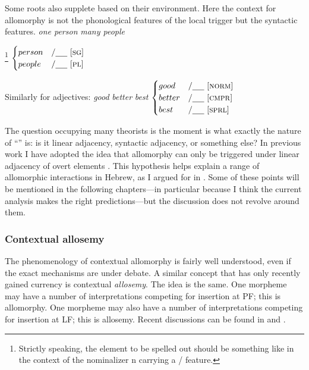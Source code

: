Some roots also supplete based on their environment. Here the context for allomorphy is not the phonological features of the local trigger but the syntactic features.
\pex
	\a \emph{one person}		
	\a \emph{many people}
\xe

\ex  {}\footnote{Strictly speaking, the element to be spelled out should be something like  in the context of the nominalizer n carrying a / feature.} \lra $\begin{cases}
	person & / \trace~ \text{[\gsc{SG}]} \\
	people & / \trace ~ \text{[\gsc{PL}]} \\
	\end{cases}$
\xe

Similarly for adjectives:
\pex
	\a \emph{good}		
	\a \emph{better}
	\a \emph{best}
\xe
\ex {} \lra $\begin{cases}
	good & / \trace~ \text{[\gsc{NORM}]} \\
	better & / \trace ~ \text{[\gsc{CMPR}]} \\
	best & / \trace ~ \text{[\gsc{SPRL}]} \\
	\end{cases}$
\xe

The question occupying many theorists is the moment is what exactly the nature of ``\trace'' is: is it linear adjacency, syntactic adjacency, or something else? In previous work I have adopted the idea that allomorphy can only be triggered under linear adjacency of overt elements \citep{embick10,marantz13}. This hypothesis helps explain a range of allomorphic interactions in Hebrew, as I argued for in \cite{kastner18nllt}. Some of these points will be mentioned in the following chapters---in particular because I think the current analysis makes the right predictions---but the discussion does not revolve around them.

		\subsubsection{Contextual allosemy}
The phenomenology of contextual allomorphy is fairly well understood, even if the exact mechanisms are under debate. A similar concept that has only recently gained currency is contextual \emph{allosemy}. The idea is the same. One morpheme may have a number of interpretations competing for insertion at PF; this is allomorphy. One morpheme may also have a number of interpretations competing for insertion at LF; this is allosemy. Recent discussions can be found in \cite{woodmarantz17} and \cite{mylermarantz19cup}.

